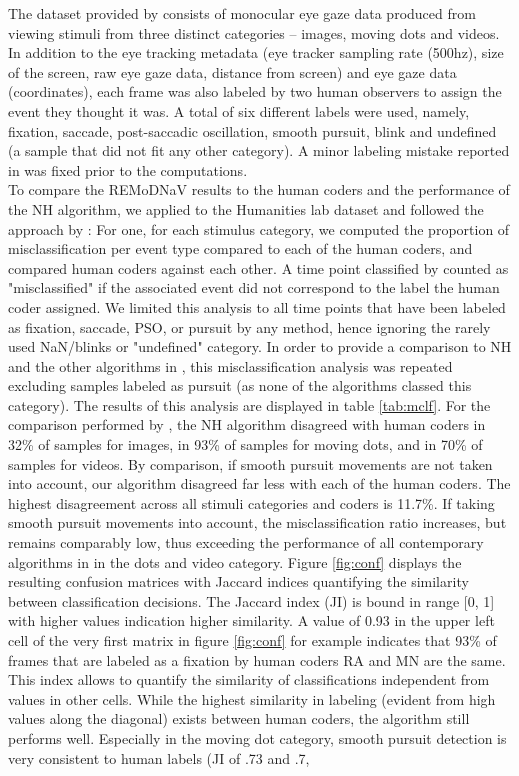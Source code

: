 The dataset provided by \cite{Andersson2017} consists of monocular eye gaze data produced from viewing stimuli from three distinct categories -- images, moving dots and videos. In addition to the eye tracking metadata (eye tracker sampling rate (500hz), size of the screen, raw eye gaze data, distance from screen) and eye gaze data (coordinates), each frame was also labeled by two human observers to assign the event they thought it was. A total of six different labels were used, namely, fixation, saccade, post-saccadic oscillation, smooth pursuit, blink and undefined (a sample that did not fit any other category). A minor labeling mistake reported in \cite{Zemblys2018} was fixed prior to the computations. \\
To compare the REMoDNaV results to the human coders and the performance of the NH  algorithm, we applied \remodnav to the Humanities lab dataset and followed the approach by \citet{Andersson2017}: For one, for each stimulus category, we computed the proportion of misclassification per event type compared to each of the human coders, and compared human coders against each other. A time point classified by \remodnav counted as "misclassified" if the associated event did not correspond to the label the human coder assigned. We limited this analysis to all time points that have been labeled as fixation, saccade, PSO, or pursuit by any method, hence ignoring the rarely used NaN/blinks or "undefined" category. In order to provide a comparison to NH and the other algorithms in \cite{Andersson2017}, this misclassification analysis was repeated excluding samples labeled as pursuit (as none of the algorithms classed this category). The results of this analysis are displayed in table \ref{tab:mclf}. For the comparison performed by \citet{Andersson2017}, the NH algorithm disagreed with human coders in 32\% of samples for images, in 93\% of samples for moving dots, and in 70\% of samples for videos. By comparison, if smooth pursuit movements are not taken into account, our algorithm disagreed far less with each of the human coders. The highest disagreement across all stimuli categories and coders is 11.7\%. If taking smooth pursuit movements into account, the misclassification ratio increases, but remains comparably low, thus exceeding the performance of all contemporary algorithms in \citet{Andersson2017} in the dots and video category. Figure \ref{fig:conf} displays the resulting confusion matrices with Jaccard indices quantifying the similarity between classification decisions.  The Jaccard index (JI) is bound in range [0, 1] with higher values indication higher similarity. A value of 0.93 in the upper left cell of the very first matrix in figure \ref{fig:conf} for example indicates that 93\% of frames that are labeled as a fixation by human coders RA and MN are the same. This index allows to quantify the similarity of classifications independent from values in other cells. While the highest similarity in labeling (evident from high values along the diagonal) exists between human coders, the algorithm still performs well. Especially in the moving dot category, smooth pursuit detection is very consistent to human labels (JI of .73 and .7, 